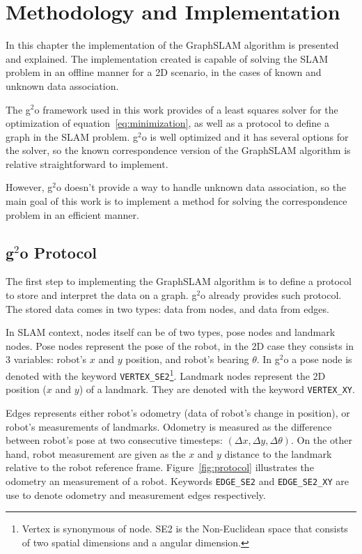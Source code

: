 \chapter{Methodology and Implementation}
\label{chap:implementation}
 
In this chapter the implementation of the GraphSLAM algorithm is presented and explained. The implementation created is capable of solving the SLAM problem in an offline manner for a 2D scenario, in the cases of known and unknown data association.

The g$^2$o framework used in this work provides of a least squares solver for the optimization of equation~\eqref{eq:minimization}, as well as a protocol to define a graph in the SLAM problem. g$^2$o is well optimized and it has several options for the solver, so the known correspondence version of the GraphSLAM algorithm is relative straightforward to implement.

However, g$^2$o doesn't provide a way to handle unknown data association, so the main goal of this work is to implement a method for solving the correspondence problem in an efficient manner.

\section{g$^2$o Protocol}

The first step to implementing the GraphSLAM algorithm is to define a protocol to store and interpret the data on a graph. g$^2$o already provides such protocol. The stored data comes in two types: data from nodes, and data from edges. 

In SLAM context, nodes itself can be of two types, pose nodes and landmark nodes. Pose nodes represent the pose of the robot, in the 2D case they consists in 3 variables: robot's $x$ and $y$ position, and robot's bearing $\theta$. In g$^2$o a pose node is denoted with the keyword \texttt{VERTEX\_SE2}\footnote{Vertex is synonymous of node. SE2 is the Non-Euclidean space that consists of two spatial dimensions and a angular dimension.}. Landmark nodes represent the 2D position ($x$ and $y$) of a landmark. They are denoted with the keyword \texttt{VERTEX\_XY}.

Edges represents either robot's odometry (data of robot's change in position), or robot's measurements of landmarks. Odometry is measured as the difference between robot's pose at two consecutive timesteps: $(\Delta x, \Delta y, \Delta \theta)$. On the other hand, robot measurement are given as the $x$ and $y$ distance to the landmark relative to the robot reference frame. Figure~\ref{fig:protocol} illustrates the odometry an measurement of a robot. Keywords \texttt{EDGE\_SE2} and \texttt{EDGE\_SE2\_XY} are use to denote odometry and measurement edges respectively.

